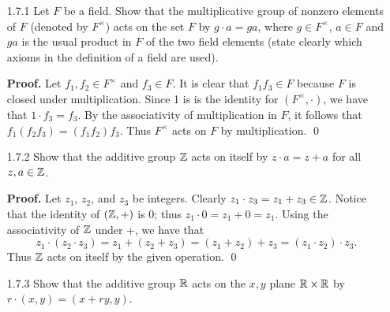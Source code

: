 \begin{enumerate}
   \item[1.7.1]   Let $F$ be a field. Show that the multiplicative group of
                  nonzero elements of $F$ (denoted by $F^\times$) acts on the
                  set $F$ by $g \cdot a = ga$, where $g \in F^\times$,
                  $a \in F$ and $ga$ is the usual product in $F$ of the two
                  field elements (state clearly which axioms in the definition
                  of a field are used).

      \textbf{Proof.} Let $f_1, f_2 \in F^\times$ and $f_3 \in F$. It is clear
      that $f_1f_3 \in F$ because $F$ is closed under multiplication. Since 1 is
      is the identity for $(F^\times, \cdot)$, we have that $1 \cdot f_3 = f_3$.
      By the associativity of multiplication in $F$, it follows that
      $f_1(f_2f_3) = (f_1f_2)f_3$. Thus $F^\times$ acts on $F$ by
      multiplication. \qed
   \item[1.7.2]   Show that the additive group $\mathbb{Z}$ acts on itself by
                  $z \cdot a = z + a$ for all $z, a \in \mathbb{Z}$.

      \textbf{Proof.} Let $z_1$, $z_2$, and $z_3$ be integers. Clearly
      $z_1 \cdot z_3 = z_1 + z_3 \in \mathbb{Z}$. Notice that the identity of $(\mathbb{Z}, +)$ 
      is 0; thus $z_1 \cdot 0 = z_1 + 0 = z_1$. Using the associativity of $\mathbb{Z}$ 
      under +, we have that
      $$z_1 \cdot (z_2 \cdot z_3) = z_1 + (z_2 + z_3) = (z_1 + z_2) + z_3 =
      (z_1 \cdot z_2) \cdot z_3.$$
      Thus $\mathbb{Z}$ acts on itself by the given operation. \qed
   \item[1.7.3]   Show that the additive group $\mathbb{R}$ acts on the $x, y$ plane
                  $\mathbb{R} \times \mathbb{R}$ by $r \cdot (x, y) = (x + ry, y)$.


\end{enumerate}
